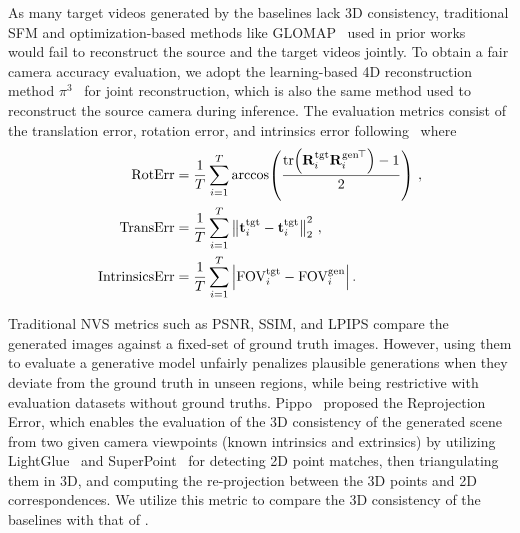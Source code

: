 As many target videos generated by the baselines lack 3D consistency, traditional SFM and optimization-based methods like GLOMAP~\cite{pan2024glomap} used in prior works~\cite{CameraCtrl, bai2025recammaster} would fail to reconstruct the source and the target videos jointly. To obtain a fair camera accuracy evaluation, we adopt the learning-based 4D reconstruction method $\pi^3$~\cite{wang2025pi3} for joint reconstruction, which is also the same method used to reconstruct the source camera during inference. The evaluation metrics consist of the translation error, rotation error, and intrinsics error following~\cite{CameraCtrl, huang2025vipe} where
\begin{align}
    \text{RotErr}
    &= \frac{1}{T}\sum_{i=1}^{T}
    \arccos\!\left(
    \frac{\operatorname{tr}\!\left(\mathbf{R}_i^{\mathrm{tgt}} {\mathbf{R}_i^{\mathrm{gen}}}^{\!\top}\right) - 1}{2}
    \right) \, ,
    \\
    \text{TransErr}
    &= \frac{1}{T}\sum_{i=1}^{T}
    \left\| \mathbf{t}_i^{\mathrm{tgt}} - \mathbf{t}_i^{\mathrm{tgt}} \right\|_2^2 \, ,
    \\
    \text{IntrinsicsErr}
    &= \frac{1}{T}\sum_{i=1}^{T}
    \left\lvert \text{FOV}_i^{\text{tgt}} - \text{FOV}_i^{\mathrm{gen}} \right\rvert.
\end{align}

 Traditional NVS metrics such as PSNR, SSIM, and LPIPS compare the generated images against a fixed-set of ground truth images. However, using them to evaluate a generative model unfairly penalizes plausible generations when they deviate from the ground truth in unseen regions, while being restrictive with evaluation datasets without ground truths. Pippo~\cite{kant2025pippo} proposed the Reprojection Error, which enables the evaluation of the 3D consistency of the generated scene from two given camera viewpoints (\ie known intrinsics and extrinsics) by utilizing LightGlue~\cite{lightglue} and SuperPoint~\cite{detone2018superpoint} for detecting 2D point matches, then triangulating them in 3D, and computing the re-projection between the 3D points and 2D correspondences. We utilize this metric to compare the 3D consistency of the baselines with that of \methodname.

